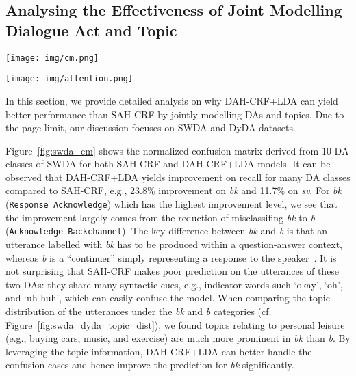 \documentclass[11pt,a4paper]{article}
\begin{document}
\subsection{Analysing the Effectiveness of Joint Modelling Dialogue Act and Topic}

\begin{figure*}[tb]
    \centering
        \texttt{[image: img/cm.png]}
    \caption{The normalized confusion matrix of DAs using SAH-CRF (left) and DAH-CRF+LDA (right) on SWDA (a) and DyDA (b).}
    \label{fig:swda_cm}
\end{figure*}

\begin{figure*}[tb]
  \centering
  \texttt{[image: img/attention.png]}
  \caption{DA Attention visualisation using SAH-CRF and DAH-CRF+LDA on (a) SWDA and (b) DyDA datasets. The true labels of the utterances above are \textit{sd} (\textit{statement-non-opinion}) and \textit{Directive}, respectively. SAH-CRF misclassified the  DA as \textit{sv} (\textit{statement-opinion}) and \textit{Inform} whereas  DAH-CRF+LDA gives correct prediction for both cases.}
  \label{fig:swda_dyda_attention}
\end{figure*}

In this section, we provide detailed analysis on why DAH-CRF+LDA can yield better performance than  SAH-CRF by jointly modelling DAs and topics. Due to the page limit, our discussion focuses on SWDA and DyDA datasets.
 



Figure~\ref{fig:swda_cm} shows the normalized confusion matrix derived from 10 DA classes of SWDA for both SAH-CRF and DAH-CRF+LDA models. 
It can be observed that DAH-CRF+LDA yields improvement on recall for many DA classes compared to SAH-CRF, e.g., 23.8\% improvement on \textit{bk} and 11.7\% on \textit{sv}. For \textit{bk} (\texttt{Response Acknowledge}) which has the highest improvement level, we see that the improvement largely comes from the reduction of misclassifing \textit{bk} to \textit{b} (\texttt{Acknowledge Backchannel}). The key difference between \textit{bk} and \textit{b} is that an utterance labelled with \textit{bk} has to be produced within a question-answer context, whereas \textit{b} is a ``continuer'' simply representing a response to the speaker~\cite{jurafsky1997switchboard}.
It is not surprising that SAH-CRF makes poor prediction on the utterances of these two DAs: they share many syntactic cues, e.g., indicator words such `okay', `oh', and `uh-huh', which can easily confuse the model. When comparing the topic distribution of the utterances under the \textit{bk} and \textit{b} categories (cf. Figure~\ref{fig:swda_dyda_topic_dist}), we found topics relating to personal leisure (e.g., buying cars, music, and exercise) are much more prominent in \textit{bk} than \textit{b}. By leveraging the topic information, DAH-CRF+LDA can better handle the confusion cases and hence improve the prediction for \textit{bk} significantly.  
\end{document}
